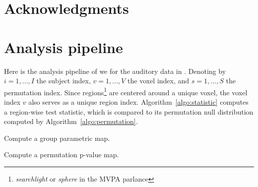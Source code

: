 \documentclass[12pt,a4paper]{article}
\theoremstyle{definition}
\begin{document}
\section{Acknowledgments}




\newpage



\appendix





\newpage
\section{Analysis pipeline}
\label{apx:analysis}

Here is the analysis pipeline of \cite{stelzer_statistical_2013} we for the auditory data in \cite{gilron_quantifying_2016}.
Denoting by 
$i=1,\dots,I$ the subject index, 
$v=1,\dots,V$ the voxel index, and 
$s = 1,\dots,S$ the permutation index. 
Since regions\footnote{\emph{searchlight} or \emph{sphere} in the MVPA parlance} are centered around a unique voxel, the voxel index $v$ also serves as a unique region index.
Algorithm~\ref{algo:statistic} computes a region-wise test statistic, which is compared to its permutation null distribution computed by Algorithm~\ref{algo:permutation}.


\begin{algorithm}[H]
\caption{Compute a group parametric map.}
\label{algo:statistic}

\end{algorithm}


\begin{algorithm}[H]
\caption{Compute a permutation p-value map.} 
\label{algo:permutation}

\end{algorithm}
\end{document}
